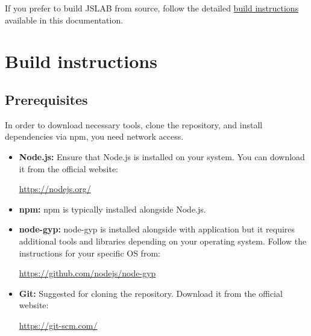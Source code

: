 \documentclass[12pt,a4paper]{article}
\begin{document}
If you prefer to build JSLAB from source, follow the detailed \hyperref[build-instructions]{build instructions} available in this documentation.

\section{Build instructions}
\label{build-instructions}

\subsection{Prerequisites}

In order to download necessary tools, clone the repository, and install dependencies via npm, you need network access.

\begin{itemize}
    \item \textbf{Node.js:} Ensure that Node.js is installed on your system. You can download it from the official website: 
    
    \url{https://nodejs.org/}
    
    \item \textbf{npm:} npm is typically installed alongside Node.js.
    
    \item \textbf{node-gyp:} node-gyp is installed alongside with application but it requires additional tools and libraries depending on your operating system. Follow the instructions for your specific OS from: 
    
    \url{https://github.com/nodejs/node-gyp}
    
    \item \textbf{Git:} Suggested for cloning the repository. Download it from the official website: 
    
    \url{https://git-scm.com/}

\end{itemize}
\end{document}
